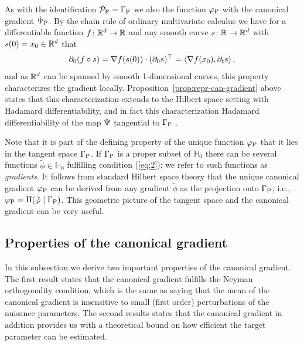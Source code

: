 \documentclass[a4,danish]{article}
\begin{document}
As with the identification $\dot{\mathcal{P}}_{\P}= \Gamma_{\P}$ we also  the
function $\phi_{\P}$ with the canonical gradient $\dot{\TT}_{\P}$. By the chain rule of ordinary
multivariate calculus we have for a differentiable function $f\colon\R^d \rightarrow \R$ and any
smooth curve $s\colon\R\rightarrow \R^d$ with $s(0) = x_0 \in \R^d$ that
\begin{equation*}
  \partial_0(f\circ s) = \nabla f(s(0)) \cdot (\partial_0{s} )^{\T}
  =
  \left\langle
    \nabla f(x_0) ,  \partial_t{s} 
  \right\rangle,
\end{equation*}
and as $\R^d$ can be spanned by smooth 1-dimensional curves, this property characterizes the
gradient locally. Proposition~\ref{prop:repr-can-gradient} above states that this characterization
extends to the Hilbert space setting with Hadamard differentiability, and in fact this
characterization  Hadamard differentiability
of the map $\TT$ tangential to $\Gamma_{\P}$ \citep[A.5]{bickel1993efficient}.

\begin{remark}
  \label{remark:gradients}
  Note that it is part of the defining property of the unique function $\phi_{\P}$ that it lies in
  the tangent space $\Gamma_{\P}$. If $\Gamma_{\P}$ is a proper subset of $\mathbb{H}_0$ there can
  be several functions $\tilde{\phi} \in \mathbb{H}_0$ fulfilling condition (\ref{eq:2}); we refer
  to such functions as \textit{gradients}. It follows from standard Hilbert space theory that the
  unique canonical gradient $\phi_{\P}$ can be derived from any gradient $\tilde{\phi}$ as the
  projection onto $\Gamma_{\P}$, i.e., $ \phi_{\P} = \Pi(\tilde{\phi} \mid \Gamma_{\P})$. This
  geometric picture of the tangent space and the canonical gradient can be very useful.
\end{remark}


\subsection{Properties of the canonical gradient}
\label{sec:prop-canon-grad}

In this subsection we derive two important properties of the canonical gradient. The first result
states that the canonical gradient fulfills the Neyman orthogonality condition, which is the same as
saying that the mean of the canonical gradient is insensitive to small (first order) perturbations
of the nuisance parameters. The second results states that the canonical gradient in addition
provides us with a theoretical bound on how efficient the target parameter can be estimated.
\end{document}
